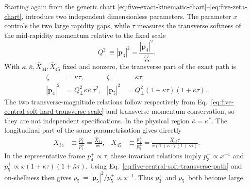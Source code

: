 \documentclass[a4paper,11pt]{article}
\begin{document}
Starting again from the generic chart
\eqref{eq:five-exact-kinematic-chart}--\eqref{eq:five-zeta-chart}, introduce
two independent dimensionless parameters.  The parameter \(x\) controls the
two large rapidity gaps, while \(\tau\) measures the transverse softness of
the mid-rapidity momentum relative to the fixed scale
\begin{equation}
 Q_\perp^2\equiv |\mathbf p_3|^2
 =\frac{|\mathbf p_4|^2}{\zeta\bar\zeta}.
 \label{eq:five-central-soft-hard-transverse-scale}
\end{equation}
With \(\kappa,\bar\kappa,\widehat X_{34},\widehat X_{45}\) fixed and
nonzero, the transverse part of the exact path is
\begin{equation}
 \begin{aligned}
  \zeta&=\kappa\tau,&
  \bar\zeta&=\bar\kappa\tau,\\
  |\mathbf p_4|^2&=Q_\perp^2\kappa\bar\kappa\,\tau^2,&
  |\mathbf p_5|^2&=Q_\perp^2
   (1+\kappa\tau)(1+\bar\kappa\tau).
 \end{aligned}
 \label{eq:five-central-soft-transverse-path}
\end{equation}
The two transverse-magnitude relations follow respectively from
Eq.~\eqref{eq:five-central-soft-hard-transverse-scale} and transverse
momentum conservation, so they are not independent specifications.  In the
physical region \(\bar\kappa=\kappa^*\).  The longitudinal part of the same
parametrisation gives directly
\begin{equation}
 \begin{aligned}
  X_{34}&\equiv\frac{p_3^+}{p_4^+}
  =\frac{\widehat X_{34}}{x\tau},&
  X_{45}&\equiv\frac{p_4^+}{p_5^+}
  =\frac{\widehat X_{45}\tau}
  {x(1+\kappa\tau)(1+\bar\kappa\tau)}.
 \end{aligned}
 \label{eq:five-central-soft-X-path}
\end{equation}
In the representative frame \(p_4^+\propto\tau\), these invariant relations
imply \(p_3^+\propto x^{-1}\) and
\(p_5^+\propto x(1+\kappa\tau)(1+\bar\kappa\tau)\).  Using
Eq.~\eqref{eq:five-central-soft-transverse-path} and on-shellness then gives
\(p_5^-=|\mathbf p_5|^2/p_5^+\propto x^{-1}\).  Thus \(p_3^+\) and
\(p_5^-\) both become large.
\end{document}
